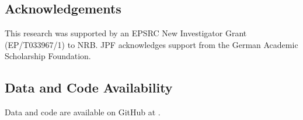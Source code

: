 \documentclass[doc,natbib,floatsintext]{apa7}
\newcommand{\MYhref}[3][blue]{\href{#2}{\color{#1}{#3}}}
\begin{document}
\subsection{Acknowledgements}
This research was supported by an EPSRC New Investigator Grant (EP/T033967/1) to NRB. JPF acknowledges support from the German Academic Scholarship Foundation.

\newcommand{\commiturl}{\url{https://github.com/janphilippfranken/zendo_final_git/\commithash}}
\subsection{Data and Code Availability}
Data and code are available on GitHub at \MYhref{https://github.com/janphilippfranken/FrankenBramleyTheodoropoulos_2022}{FrankenTheodoropoulosBramley2022}. 




\end{document}

